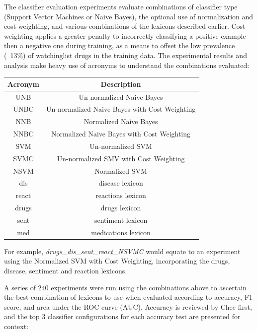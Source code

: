 \documentclass[twoside,11pt]{article}
\begin{document}
The classifier evaluation experiments evaluate combinations of classifier type (Support Vector Machines or Naive Bayes), the optional use of normalization and cost-weighting, and various combinations of the lexicons described earlier. Cost-weighting applies a greater penalty to incorrectly classifying a positive example then a negative one during training, as a means to offset the low prevalence (~13\%) of watchinglist drugs in the training data. The experimental results and analysis make heavy use of acronyms to understand the combinations evaluated:

\begin{center}
  \begin{tabular}{|c|c|}
    \hline
    Acronym & Description\\
    \hline\hline
    UNB & Un-normalized Naive Bayes\\
    \hline
    UNBC & Un-normalized Naive Bayes with Cost Weighting\\
    \hline
    NNB & Normalized Naive Bayes\\
    \hline
    NNBC & Normalized Naive Bayes with Cost Weighting\\
    \hline
    SVM & Un-normalized SVM\\
    \hline
    SVMC & Un-normalized SMV with Cost Weighting\\
    \hline
    NSVM & Normalized SVM\\
    \hline
    dis & disease lexicon\\
    \hline
    react & reactions lexicon\\
    \hline
    drugs & drugs lexicon\\
    \hline
    sent & sentiment lexicon\\
    \hline
    med & medications lexicon\\
    \hline
  \end{tabular}
\end{center}
For example, \textit{drugs\_dis\_sent\_react\_NSVMC} would equate to an experiment using the Normalized SVM with Cost Weighting, incorporating the drugs, disease, sentiment and reaction lexicons.

A series of 240 experiments were run using the combinations above to ascertain the best combination of lexicons to use when evaluated according to accuracy, F1 score, and area under the ROC curve (AUC). Accuracy is reviewed by Chee first, and the top 3 classifier configurations for each accuracy test are presented for context:
\end{document}
